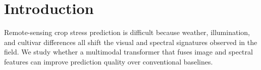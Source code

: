 \section{Introduction}
Remote-sensing crop stress prediction is difficult because weather, illumination, and cultivar differences all shift the visual and spectral signatures observed in the field. We study whether a multimodal transformer that fuses image and spectral features can improve prediction quality over conventional baselines.
